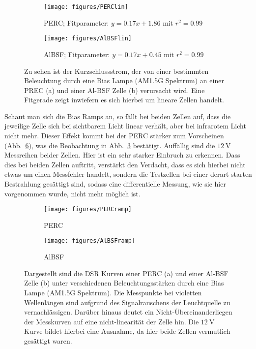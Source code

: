 \documentclass[ngerman, twocolumn]{scrartcl}
\begin{document}
\begin{figure}[h!]
\begin{subfigure}{\columnwidth}
\texttt{[image: figures/PERClin]}
\caption{PERC; Fitparameter: $y = 0.17x+1.86$ mit $r^2 = 0.99$}
\label{fig:PERClin}
\end{subfigure}

\begin{subfigure}{\columnwidth}
\texttt{[image: figures/AlBSFlin]}
\caption{AlBSF; Fitparameter: $y = 0.17x+0.45$ mit $r^2 = 0.99$}
\label{fig:AlBSFlin}
\end{subfigure}
\caption{Zu sehen ist der Kurzschlussstrom, der von einer bestimmten Beleuchtung durch eine Bias Lampe (AM1.5G Spektrum) an einer PREC (a) und einer Al-BSF Zelle (b) verursacht wird. Eine Fitgerade zeigt inwiefern es sich hierbei um lineare Zellen handelt.}
\label{fig:linearities}
\end{figure}

Schaut man sich die Bias Ramps an, so fällt bei beiden Zellen auf, dass die jeweilige Zelle sich bei sichtbarem Licht linear verhält, aber bei infrarotem Licht nicht mehr. Dieser Effekt kommt bei der PERC stärker zum Vorscheinen (Abb.~\ref{fig:ramps}), was die Beobachtung in Abb.~\ref{fig:linearities} bestätigt. Auffällig sind die $\SI{12}{\volt}$ Messreihen beider Zellen. Hier ist ein sehr starker Einbruch zu erkennen. Dass dies bei beiden Zellen auftritt, verstärkt den Verdacht, dass es sich hierbei nicht etwas um einen Messfehler handelt, sondern die Testzellen bei einer derart starten Bestrahlung gesättigt sind, sodass eine differentielle Messung, wie sie hier vorgenommen wurde, nicht mehr möglich ist.

\begin{figure}
\begin{subfigure}{\columnwidth}
\texttt{[image: figures/PERCramp]}
\caption{PERC}
\label{fig:PERCramp}
\end{subfigure}

\begin{subfigure}{\columnwidth}
\texttt{[image: figures/AlBSFramp]}
\caption{AlBSF}
\label{fig:AlBSFramp}
\end{subfigure}
\caption{Dargestellt sind die DSR Kurven einer PERC (a) und einer Al-BSF Zelle (b) unter verschiedenen Beleuchtungsstärken durch eine Bias Lampe (AM1.5G Spektrum). Die Messpunkte bei violetten Wellenlängen sind aufgrund des Signalrauschens der Leuchtquelle zu vernachlässigen. Darüber hinaus deutet ein Nicht-Übereinanderliegen der Messkurven auf eine nicht-linearität der Zelle hin. Die $\SI{12}{\volt}$ Kurve bildet hierbei eine Ausnahme, da hier beide Zellen vermutlich gesättigt waren.}
\label{fig:ramps}
\end{figure}
\end{document}
